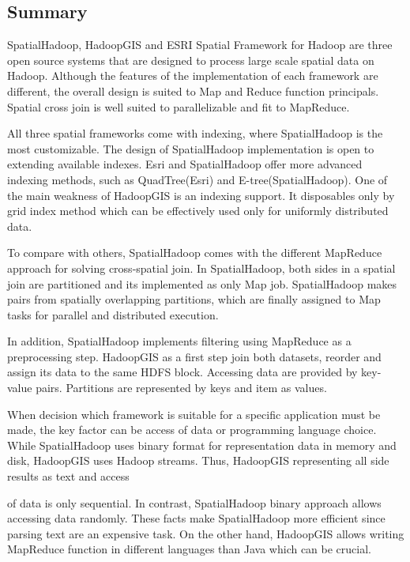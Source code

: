 \documentclass[a4paper,12pt,oneside]{report}
\begin{document}
		\subsection{Summary}
		
 SpatialHadoop, HadoopGIS and ESRI Spatial Framework for Hadoop are
three open source systems that are designed to process large scale
spatial data on Hadoop. Although the features of  the implementation of each framework are different, 
the overall design is suited to Map and Reduce function principals. Spatial cross join is well suited to parallelizable and fit to MapReduce. 

All three spatial frameworks come with indexing, where SpatialHadoop is the most customizable. 
The design of  SpatialHadoop implementation is open to extending available indexes. Esri and 
SpatialHadoop offer more advanced indexing methods, such as 
QuadTree(Esri) and E-tree(SpatialHadoop). One of the main weakness of HadoopGIS is an indexing 
support. It disposables only by grid index method which can be 
effectively used only for uniformly distributed data.

To compare with others, SpatialHadoop comes with the different MapReduce approach for solving cross-spatial join.
In SpatialHadoop, both sides in a spatial join are partitioned and its implemented as only 
Map job.  SpatialHadoop makes pairs from spatially overlapping partitions, which are finally 
assigned to Map tasks for parallel and distributed execution.

In addition, SpatialHadoop implements filtering using MapReduce as a preprocessing step.
HadoopGIS as a first step join both datasets, reorder and assign its data to the same 
HDFS block.  Accessing data are provided by key-value pairs. Partitions are represented by keys and item as values. 

When decision which framework is suitable for a specific application must be made, the 
key factor can be access of data  or programming language choice. While SpatialHadoop 
uses binary format for representation data in memory and disk, HadoopGIS 
uses Hadoop streams. Thus, HadoopGIS representing all side results as text and access 

of data is only sequential. In contrast, SpatialHadoop binary approach allows 
accessing data randomly.
These facts make SpatialHadoop more efficient since parsing text are an expensive task. 
On the other hand, HadoopGIS allows writing MapReduce function in different languages than Java which can be crucial. 
\end{document}
